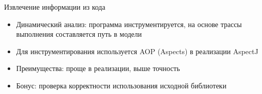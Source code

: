 \documentclass[12pt]{beamer}
\begin{document}
{
\begin{frame}{Извлечение информации из кода}
	\begin{mybox}[]
		\begin{itemize}
			\item Динамический анализ: программа инструментируется, на основе трассы выполнения составляется путь в модели
			\item Для инструментирования используется AOP (Aspects) в реализации AspectJ
			\item Преимущества: проще в реализации, выше точность
			\item Бонус: проверка корректности использования исходной библиотеки
		\end{itemize}
	\end{mybox}
\end{frame}
}
\end{document}
